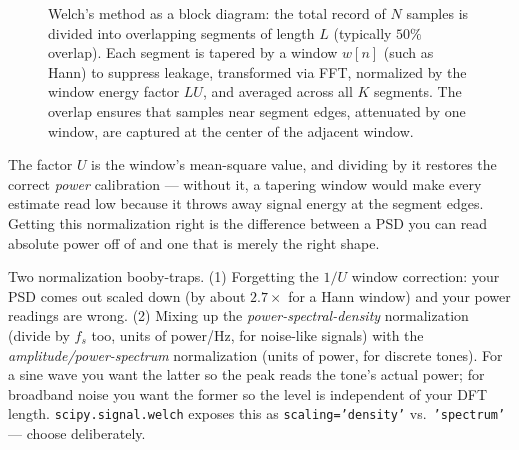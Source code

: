 \begin{figure}[H]
\caption{Welch's method as a block diagram: the total record of $N$ samples is
divided into overlapping segments of length $L$ (typically $50\%$ overlap). Each segment
is tapered by a window $w[n]$ (such as Hann) to suppress leakage, transformed via FFT,
normalized by the window energy factor $LU$, and averaged across all $K$ segments. The
overlap ensures that samples near segment edges, attenuated by one window, are captured
at the center of the adjacent window.}
\label{ch21:fig-welch-pipeline}
\end{figure}

The factor $U$ is the window's mean-square value, and dividing by it restores the
correct \emph{power} calibration --- without it, a tapering window would make every
estimate read low because it throws away signal energy at the segment edges. Getting
this normalization right is the difference between a PSD you can read absolute power
off of and one that is merely the right shape.

\begin{trapbox}
Two normalization booby-traps. (1) Forgetting the $1/U$ window correction: your PSD
comes out scaled down (by about $2.7\times$ for a Hann window) and your power
readings are wrong. (2) Mixing up the \emph{power-spectral-density}
normalization (divide by $f_s$ too, units of power/Hz, for noise-like signals) with
the \emph{amplitude/power-spectrum} normalization (units of power, for discrete
tones). For a sine wave you want the latter so the peak reads the tone's actual
power; for broadband noise you want the former so the level is independent of your
DFT length. \texttt{scipy.signal.welch} exposes this as
\texttt{scaling='density'} vs.\ \texttt{'spectrum'} --- choose deliberately.
\end{trapbox}


